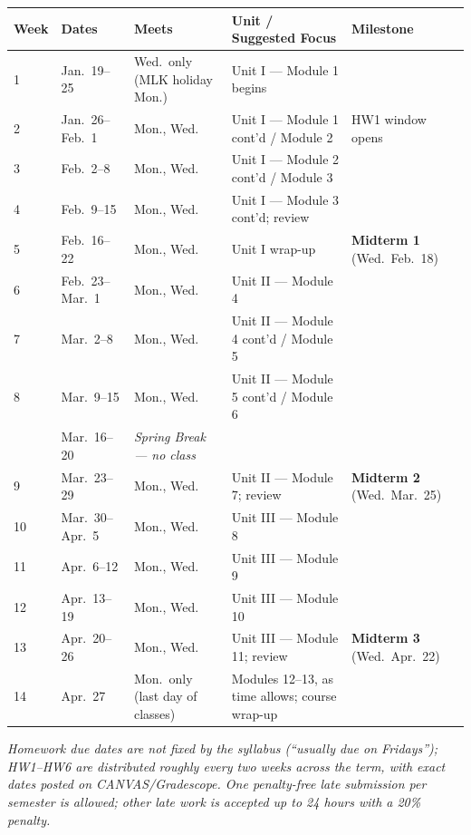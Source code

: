 \documentclass[11pt]{article}
\begin{document}
\renewcommand{\arraystretch}{1.25}
\begin{longtable}{p{1.0cm} p{2.5cm} p{1.6cm} p{5.7cm} p{2.7cm}}
\toprule
\textbf{Week} & \textbf{Dates} & \textbf{Meets} & \textbf{Unit / Suggested Focus} & \textbf{Milestone} \\
\midrule
\endhead
1  & Jan.\ 19--25  & Wed.\ only (MLK holiday Mon.) & Unit I --- Module 1 begins & \\
2  & Jan.\ 26--Feb.\ 1  & Mon., Wed. & Unit I --- Module 1 cont'd / Module 2 & HW1 window opens \\
3  & Feb.\ 2--8    & Mon., Wed. & Unit I --- Module 2 cont'd / Module 3 & \\
4  & Feb.\ 9--15   & Mon., Wed. & Unit I --- Module 3 cont'd; review & \\
5  & Feb.\ 16--22  & Mon., Wed. & Unit I wrap-up & \textbf{Midterm 1} (Wed.\ Feb.\ 18) \\
6  & Feb.\ 23--Mar.\ 1 & Mon., Wed. & Unit II --- Module 4 & \\
7  & Mar.\ 2--8    & Mon., Wed. & Unit II --- Module 4 cont'd / Module 5 & \\
8  & Mar.\ 9--15   & Mon., Wed. & Unit II --- Module 5 cont'd / Module 6 & \\
   & Mar.\ 16--20  & \emph{Spring Break --- no class} & & \\
9  & Mar.\ 23--29  & Mon., Wed. & Unit II --- Module 7; review & \textbf{Midterm 2} (Wed.\ Mar.\ 25) \\
10 & Mar.\ 30--Apr.\ 5 & Mon., Wed. & Unit III --- Module 8 & \\
11 & Apr.\ 6--12   & Mon., Wed. & Unit III --- Module 9 & \\
12 & Apr.\ 13--19  & Mon., Wed. & Unit III --- Module 10 & \\
13 & Apr.\ 20--26  & Mon., Wed. & Unit III --- Module 11; review & \textbf{Midterm 3} (Wed.\ Apr.\ 22) \\
14 & Apr.\ 27      & Mon.\ only (last day of classes) & Modules 12--13, as time allows; course wrap-up & \\
\bottomrule
\end{longtable}

\textit{Homework due dates are not fixed by the syllabus (``usually due on Fridays''); HW1--HW6 are
distributed roughly every two weeks across the term, with exact dates posted on CANVAS/Gradescope. One
penalty-free late submission per semester is allowed; other late work is accepted up to 24 hours with
a 20\% penalty.}

\end{document}

